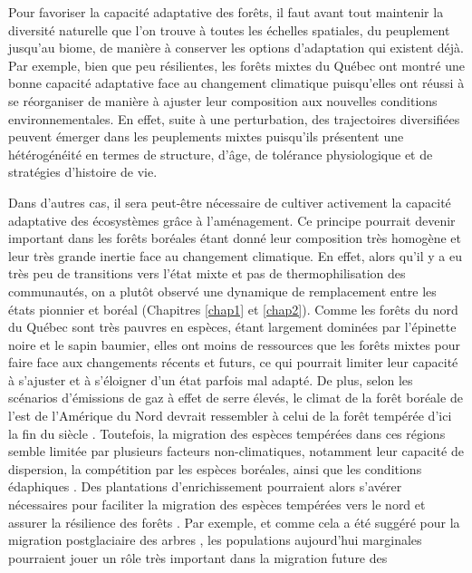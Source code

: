 Pour favoriser la capacité adaptative des forêts, il faut avant tout
maintenir la diversité naturelle que l'on trouve à toutes les échelles
spatiales, du peuplement jusqu'au biome, de manière à conserver les
options d'adaptation qui existent déjà. Par exemple, bien que peu
résilientes, les forêts mixtes du Québec ont montré une bonne capacité
adaptative face au changement climatique puisqu'elles ont réussi à se
réorganiser de manière à ajuster leur composition aux nouvelles
conditions environnementales. En effet, suite à une perturbation, des
trajectoires diversifiées peuvent émerger dans les peuplements mixtes
puisqu'ils présentent une hétérogénéité en termes de structure, d'âge,
de tolérance physiologique et de stratégies d'histoire de vie.

Dans d'autres cas, il sera peut-être nécessaire de cultiver activement
la capacité adaptative des écosystèmes grâce à l'aménagement. Ce
principe pourrait devenir important dans les forêts boréales étant donné
leur composition très homogène et leur très grande inertie face au
changement climatique. En effet, alors qu'il y a eu très peu de
transitions vers l'état mixte et pas de thermophilisation des
communautés, on a plutôt observé une dynamique de remplacement entre les
états pionnier et boréal (Chapitres \ref{chap1} et \ref{chap2}). Comme
les forêts du nord du Québec sont très pauvres en espèces, étant
largement dominées par l'épinette noire et le sapin baumier, elles ont
moins de ressources que les forêts mixtes pour faire face aux
changements récents et futurs, ce qui pourrait limiter leur capacité à
s'ajuster et à s'éloigner d'un état parfois mal adapté. De plus, selon
les scénarios d'émissions de gaz à effet de serre élevés, le climat de
la forêt boréale de l'est de l'Amérique du Nord devrait ressembler à
celui de la forêt tempérée d'ici la fin du siècle
\citep{gauthier_boreal_2015}. Toutefois, la migration des espèces
tempérées dans ces régions semble limitée par plusieurs facteurs
non-climatiques, notamment leur capacité de dispersion, la compétition
par les espèces boréales, ainsi que les conditions édaphiques
\citep[Chapitre
\ref{chap3};][]{carteron_soil_2020, solarik_priority_2019}. Des
plantations d'enrichissement pourraient alors s'avérer nécessaires pour
faciliter la migration des espèces tempérées vers le nord et assurer la
résilience des forêts \citep{duveneck_measuring_2016}. Par exemple, et
comme cela a été suggéré pour la migration postglaciaire des arbres
\citep{mclachlan_molecular_2005}, les populations aujourd'hui marginales
pourraient jouer un rôle très important dans la migration future des
